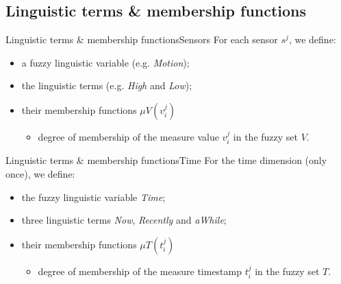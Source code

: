 \documentclass[9pt, handout]{beamer}
\begin{document}
    \subsection{Linguistic terms \& membership functions}
      \begin{frame}{Linguistic terms \& membership functions}{Sensors}
        \pause
        For each sensor $s^j$, we define:
        \pause
        \begin{itemize}
          \item a fuzzy linguistic variable (e.g. \textit{Motion});
          \pause
          \item the linguistic terms (e.g. \textit{High} and \textit{Low});
          \pause
          \item their membership functions $\mu V(v^j_i)$
          \begin{itemize}
            \item degree of membership of the measure value $v^j_i$ in the fuzzy set $V$.
          \end{itemize}
        \end{itemize}
        
        \pause
      \end{frame}
      
      \begin{frame}{Linguistic terms \& membership functions}{Time}
        \pause
        For the time dimension (only once), we define:
        \pause
        \begin{itemize}
          \item the fuzzy linguistic variable \textit{Time};
          \pause
          \item three linguistic terms \textit{Now}, \textit{Recently} and \textit{aWhile};
          \pause
          \item their membership functions $\mu T(t^j_i)$
          \begin{itemize}
            \item degree of membership of the measure timestamp $t^j_i$ in the fuzzy set $T$.
          \end{itemize}
        \end{itemize}
        
        \pause
      \end{frame}
      
\end{document}
